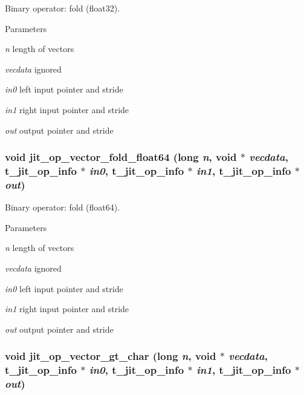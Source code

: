 Binary operator: fold (float32). 
\begin{DoxyParams}{Parameters}
\item[{\em n}]length of vectors \item[{\em vecdata}]ignored \item[{\em in0}]left input pointer and stride \item[{\em in1}]right input pointer and stride \item[{\em out}]output pointer and stride \end{DoxyParams}
\hypertarget{group__opvecmod_gaea2e3cbdf2fb27800355ca7d7e916a08}{
\subsubsection[{jit\_\-op\_\-vector\_\-fold\_\-float64}]{\setlength{\rightskip}{0pt plus 5cm}void jit\_\-op\_\-vector\_\-fold\_\-float64 (long {\em n}, \/  void $\ast$ {\em vecdata}, \/  {\bf t\_\-jit\_\-op\_\-info} $\ast$ {\em in0}, \/  {\bf t\_\-jit\_\-op\_\-info} $\ast$ {\em in1}, \/  {\bf t\_\-jit\_\-op\_\-info} $\ast$ {\em out})}}
\label{group__opvecmod_gaea2e3cbdf2fb27800355ca7d7e916a08}


Binary operator: fold (float64). 
\begin{DoxyParams}{Parameters}
\item[{\em n}]length of vectors \item[{\em vecdata}]ignored \item[{\em in0}]left input pointer and stride \item[{\em in1}]right input pointer and stride \item[{\em out}]output pointer and stride \end{DoxyParams}
\hypertarget{group__opvecmod_gaf739142c2345942fd9a33add25226253}{
\subsubsection[{jit\_\-op\_\-vector\_\-gt\_\-char}]{\setlength{\rightskip}{0pt plus 5cm}void jit\_\-op\_\-vector\_\-gt\_\-char (long {\em n}, \/  void $\ast$ {\em vecdata}, \/  {\bf t\_\-jit\_\-op\_\-info} $\ast$ {\em in0}, \/  {\bf t\_\-jit\_\-op\_\-info} $\ast$ {\em in1}, \/  {\bf t\_\-jit\_\-op\_\-info} $\ast$ {\em out})}}
\label{group__opvecmod_gaf739142c2345942fd9a33add25226253}


